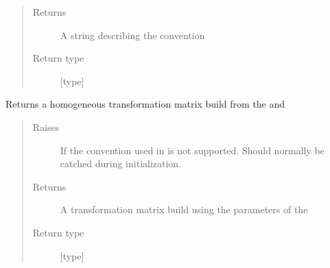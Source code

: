 \documentclass[letterpaper,10pt,english]{sphinxmanual}
\begin{document}
\begin{fulllineitems}
\begin{fulllineitems}
\begin{quote}
\begin{description}
\begin{itemize}
\end{itemize}

\item[{Returns}] \leavevmode
A string describing the convention

\item[{Return type}] \leavevmode
{[}type{]}

\end{description}\end{quote}

\end{fulllineitems}


\begin{fulllineitems}
\label{\detokenize{code_docu:trip_kinematics.KinematicGroup.Transformation.get_transformation_matrix}}
Returns a homogeneous transformation matrix build from the  and 
\begin{quote}\begin{description}
\item[{Raises}] \leavevmode
{} \textendash{} If the convention used in  is not supported. Should normally be catched during initialization.

\item[{Returns}] \leavevmode
A transformation matrix build using the parameters of the  {\hyperref[\detokenize{code_docu:trip_kinematics.KinematicGroup.Transformation}]{}} 

\item[{Return type}] \leavevmode
{[}type{]}

\end{description}\end{quote}

\end{fulllineitems}


\end{fulllineitems}

\label{\detokenize{code_docu:module-trip_kinematics.Robot}}
\end{document}
